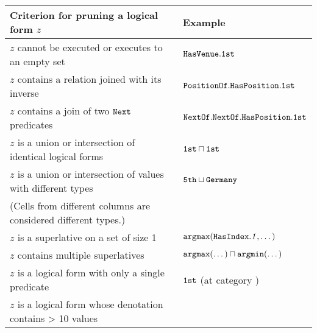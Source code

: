 \begin{tabular}{ll} \toprule
\textbf{Criterion for pruning a logical form $z$} & \textbf{Example} \\ \midrule
$z$ cannot be executed or executes to an empty set
& $\texttt{Has}{\texttt{Venue}}.\texttt{1st}$ \\
$z$ contains a relation joined with its inverse
& ${\texttt{Position}}\texttt{Of}.\texttt{Has}{\texttt{Position}}.\texttt{1st}$ \\
$z$ contains a join of two $\texttt{Next}$ predicates
& ${\texttt{Next}}\texttt{Of}.{\texttt{Next}}\texttt{Of}.\texttt{Has}{\texttt{Position}}.\texttt{1st}$ \\
$z$ is a union or intersection of identical logical forms
& $\texttt{1st} \sqcap \texttt{1st}$ \\
$z$ is a union or intersection of values with different types
& $\texttt{5th} \sqcup \texttt{Germany}$ \\
\quad (Cells from different columns are considered different types.) \\
$z$ is a superlative on a set of size 1
& $\texttt{argmax}(\texttt{Has}{\texttt{Index}}.\text{\emph{1}}, \dots)$ \\
$z$ contains multiple superlatives
& $\texttt{argmax}(\dots) \sqcap \texttt{argmin}(\dots)$ \\
$z$ is a \C{ROOT} logical form with only a single predicate
& $\texttt{1st}$ (at category \C{ROOT})\\
$z$ is a \C{ROOT} logical form whose denotation contains > 10 values \\
\bottomrule
\end{tabular}